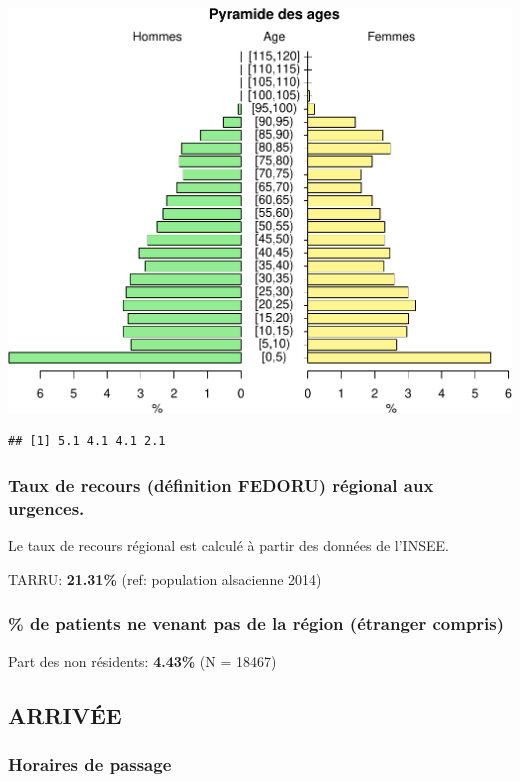\documentclass[]{article}
\begin{document}
\includegraphics{rapport2014_V4_files/figure-latex/pyramide-1.pdf}

\begin{verbatim}
## [1] 5.1 4.1 4.1 2.1
\end{verbatim}

\subsubsection{Taux de recours (définition FEDORU) régional aux
urgences.}\label{taux-de-recours-definition-fedoru-regional-aux-urgences.}

Le taux de recours régional est calculé à partir des données de l'INSEE.

TARRU: \textbf{21.31\%} (ref: population alsacienne 2014)

\subsubsection{\% de patients ne venant pas de la région (étranger
compris)}\label{de-patients-ne-venant-pas-de-la-region-etranger-compris}

Part des non résidents: \textbf{4.43\%} (N = 18467)

\subsection{ARRIVÉE}\label{arrivee}

\subsubsection{Horaires de passage}\label{horaires-de-passage}
\end{document}
